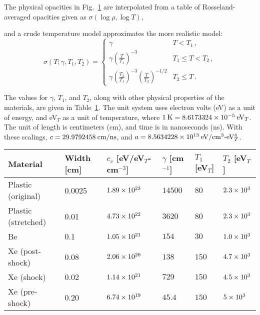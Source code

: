 The physical opacities in Fig.~\ref{fig:seriousOpacity} are interpolated from a
table of Rosseland-averaged opacities given as $\sigma(\log \rho, \log T)$, 
%
\begin{figure}[htb]
  \centering\small
  
  \label{fig:seriousOpacity}
\end{figure}
%
and a crude temperature model approximates the more realistic model:
\begin{equation*}
  \sigma(T;\gamma,T_1,T_2) =
  \begin{cases}
    \gamma   & T < T_1\,, \\
    \gamma \left( \frac{T}{T_1} \right)^{-3}   & T_1 \le T < T_2\,, \\
    \gamma \left( \frac{T_2}{T_1} \right)^{-3}
    \left( \frac{T}{T_2} \right)^{-1/2}   & T_2 \le T \,.
  \end{cases}
\end{equation*}

The values for $\gamma$, $T_1$, and $T_2$, along with other physical properties
of the materials, are given in Table~\ref{tab:seriousPhysics}. The unit system
uses electron volts (eV) as a unit of energy, and eV$_T$ as a unit of temperature, where
$1\:\text{K} = 8.6173324\times 10^{-5} \:\text{eV$_T$}$. The unit of length is centimeters
(cm), and time is in nanoseconds (ns). With these scalings, $c=29.9792458
\:\text{cm/ns}$, and $a=8.5634228\times 10^{13} \:\text{eV/cm$^3$-eV$_T^4$}$.

\begin{table}[htb]
  \centering
  \begin{tabular}{llllll}
\toprule
Material & Width [cm] & $c_v$ [eV/eV$_T$-cm$^{-3}$] & $\gamma$ [cm$^{-1}$]
& $T_1$ [eV$_T$] & $T_2$ [eV$_T$]
\\ \midrule
Plastic (original) & 0.0025 & $1.89\times 10^{23}$ & $14500$ & $80$ & $2.3\times 10^{3}$\\
Plastic (stretched) & 0.01 & $4.73\times 10^{22}$ & $3620$ & $80$ & $2.3\times 10^{3}$\\
Be & 0.1 & $1.05\times 10^{21}$ & $154$ & $30$ & $1.0\times 10^{3}$\\
Xe (post-shock) & 0.08 & $2.06\times 10^{20}$ & $138$ & $150$ & $4.7\times 10^{3}$\\
Xe (shock) & 0.02 & $1.14\times 10^{21}$ & $729$ & $150$ & $4.5\times 10^{3}$\\
Xe (pre-shock) & 0.20 & $6.74\times 10^{19}$ & $45.4$ & $150$ & $5\times 10^{3}$
\\ \bottomrule
  \end{tabular}
  \label{tab:seriousPhysics}
\end{table}

